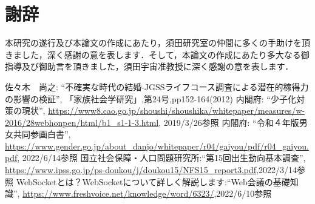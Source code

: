 \documentclass[12pt,a4j,titlepage]{ltjsarticle}
\begin{document}
\clearpage



\section{謝辞}
本研究の遂行及び本論文の作成にあたり，須田研究室の仲間に多くの手助けを頂きました，深く感謝の意を表します．そして，本論文の作成にあたり多大なる御指導及び御助言を頂きました，須田宇宙准教授に深く感謝の意を表します．

\clearpage

\begin{thebibliography}{99}
 佐々木　尚之: ``不確実な時代の結婚-JGSSライフコース調査による潜在的稼得力の影響の検証'', 「家族社会学研究」,第24号,pp152-164(2012)
 内閣府: ``少子化対策の現状'', \url{https://www8.cao.go.jp/shoushi/shoushika/whitepaper/measures/w-2016/28webhonpen/html/b1_s1-1-3.html}, 2019/3/26参照
 内閣府: ``令和４年版男女共同参画白書'', \url{https://www.gender.go.jp/about_danjo/whitepaper/r04/gaiyou/pdf/r04_gaiyou.pdf}, 2022/6/14参照
国立社会保障・人口問題研究所:``第15回出生動向基本調査'',
\url{https://www.ipss.go.jp/ps-doukou/j/doukou15/NFS15_report3.pdf},2022/3/14参照
WebSocketとは？WebSocketについて詳しく解説します:``Web会議の基礎知識'',
\url{https://www.freshvoice.net/knowledge/word/6323/},2022/6/10参照
\end{thebibliography}
\end{document}
